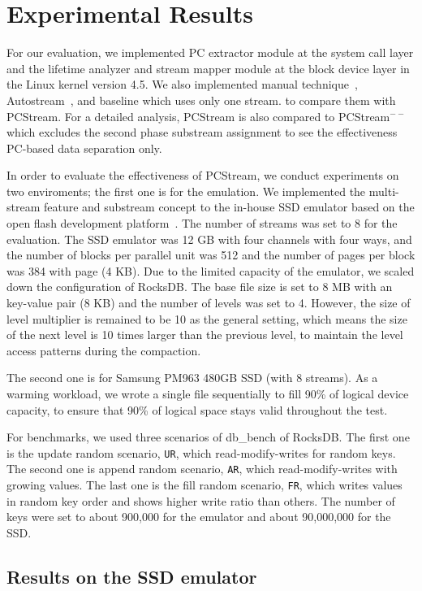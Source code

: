 \section{Experimental Results}
For our evaluation, we implemented PC extractor module at the 
system call layer 
and the lifetime analyzer and stream mapper module 
at the block device layer in the Linux kernel version 4.5.
We also implemented manual technique~\cite{MultiStream}, 
Autostream~\cite{AutoStream}, and
baseline which uses only one stream.
to compare them with {\sf PCStream}.
For a detailed analysis, {\sf PCStream} is also compared to {\sf PCStream}$^{--}$
which excludes the second phase substream assignment 
to see the effectiveness PC-based data separation only.

In order to evaluate the effectiveness of {\sf PCStream},
we conduct experiments on two enviroments; the first one is 
for the emulation.
We implemented the multi-stream feature and substream concept
to the in-house SSD emulator
based on the open flash development platform~\cite{AMF}.
The number of streams was set to 8 for the evaluation.
The SSD emulator was 12 GB with four channels with four ways, and 
the number of blocks per parallel unit was 512 and
the number of pages per block was 384 with page (4 KB).
Due to the limited capacity of the emulator, 
we scaled down the configuration of RocksDB.
The base file size is set to 8 MB
with an key-value pair (8 KB) and the number of levels was set to 4.
However, the size of level multiplier is remained to be 10 as the general setting,
which means the size of the next level is 10 times larger than the previous level,
to maintain the level access patterns during the compaction.

The second one is for Samsung PM963 480GB SSD (with 8 streams).
As a warming workload, we wrote a single file sequentially to fill 90\%
of logical device capacity, to ensure that 90\% of logical space stays valid
throughout the test.

For benchmarks, we used three scenarios of db\_bench of RocksDB.
The first one is the update random scenario, {\tt UR}, which read-modify-writes for random keys. 
The second one is append random scenario, {\tt AR}, which read-modify-writes with growing values.
The last one is the fill random scenario, {\tt FR}, which writes values in random key order and 
shows higher write ratio than others.
The number of keys were set to about 900,000 for the emulator and about 90,000,000 for
the SSD.

\subsection{Results on the SSD emulator}

